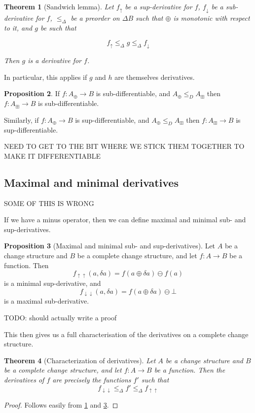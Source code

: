 \documentclass[english]{article}
\theoremstyle{plain}
\newtheorem{thm}{Theorem}
\theoremstyle{definition}
\newtheorem{prop}[thm]{Proposition}
\theoremstyle{remark}
\theoremstyle{remark}
\theoremstyle{remark}
\theoremstyle{definition}
\newcommand{\cplus}{\oplus}
\newcommand{\cpluss}{\boxplus}
\newcommand{\cminus}{\ominus}
\newcommand{\changes}[1]{\Delta #1}
\newcommand{\change}[1]{\delta #1}
\newcommand{\derive}[1]{#1'}
\newcommand{\supderive}[1]{#1_\uparrow}
\newcommand{\supderiveM}[1]{#1_{\uparrow\uparrow}}
\newcommand{\subderive}[1]{#1_\downarrow}
\newcommand{\subderiveM}[1]{#1_{\downarrow\downarrow}}
\newcommand{\changeOrder}{\leq_\Delta}
\newcommand{\fineOrder}{\leq_D}
\begin{document}
\begin{thm}[Sandwich lemma]
  \label{thm:sandwich}
  Let $\supderive{f}$ be a sup-derivative for $f$, $\subderive{f}$ be a sub-derivative for $f$, $\changeOrder$ be a preorder on $\changes{B}$ such that $\cplus$ is monotonic with
  respect to it, and $g$ be such that

  $$\supderive{f} \changeOrder g \changeOrder \subderive{f}$$

  Then $g$ is a derivative for $f$.
\end{thm}

In particular, this applies if $g$ and $h$ are themselves derivatives.

\begin{prop}
  If $f: A_\cplus \rightarrow B$ is sub-differentiable, and $A_\cplus \fineOrder
  A_\cpluss$ then $f: A_\cpluss \rightarrow B$ is sub-differentiable.
  
  Similarly, if $f: A_\cplus \rightarrow B$ is sup-differentiable, and $A_\cplus \fineOrder
  A_\cpluss$ then $f: A_\cpluss \rightarrow B$ is sup-differentiable.
\end{prop}

NEED TO GET TO THE BIT WHERE WE STICK THEM TOGETHER TO MAKE IT DIFFERENTIABLE

\subsection{Maximal and minimal derivatives}

SOME OF THIS IS WRONG

If we have a minus operator, then we can define maximal and minimal sub- and sup-derivatives.

\begin{prop}[Maximal and minimal sub- and sup-derivatives]
  \label{prop:maximalDerivatives}
  Let $A$ be a change structure and $B$ be a complete change structure, and let $f: A \rightarrow B$ be a function. Then
  $$\supderiveM{f}(a, \change{a}) = f(a \cplus \change{a}) \cminus f(a)$$
  is a minimal sup-derivative, and
  $$\subderiveM{f}(a, \change{a}) = f(a \cplus \change{a}) \cminus \bot$$
  is a maximal sub-derivative.

  TODO: should actually write a proof
\end{prop}

This then gives us a full characterisation of the derivatives on a complete
change structure.

\begin{thm}[Characterization of derivatives]
  Let $A$ be a change structure and $B$ be a complete change structure, and let
  $f: A \rightarrow B$ be a function. Then the derivatives of $f$ are precisely
  the functions $\derive{f}$ such that
  $$\subderiveM{f} \changeOrder \derive{f} \changeOrder \supderiveM{f}$$
\end{thm}
\begin{proof}
  Follows easily from \ref{thm:sandwich} and \ref{prop:maximalDerivatives}.
\end{proof}
\end{document}
